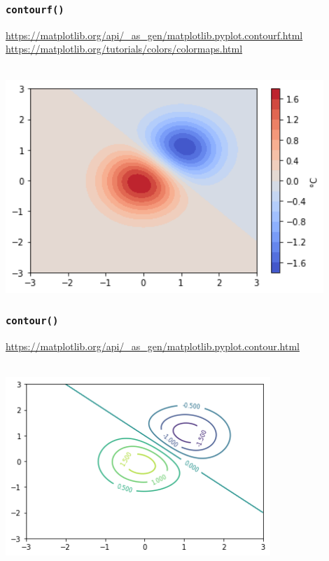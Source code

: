 	\subsubsection{\texttt{contourf()}}
\url{https://matplotlib.org/api/_as_gen/matplotlib.pyplot.contourf.html}\\
\url{https://matplotlib.org/tutorials/colors/colormaps.html}\\
\begin{minipage}[t]{0.54\textwidth}
	
\end{minipage}
\hspace{0.02\textwidth}
\begin{minipage}[t]{0.44\textwidth}
	$\quad$\\[1pt]
	\includegraphics[width=0.9\textwidth]{images/v9_matplotlib2}
\end{minipage}




\subsubsection{\texttt{contour()}}
\url{https://matplotlib.org/api/_as_gen/matplotlib.pyplot.contour.html}\\
\begin{minipage}[t]{0.49\textwidth}
	
\end{minipage}
\hspace{0.02\textwidth}
\begin{minipage}[t]{0.49\textwidth}
	$\quad$\\[1pt]
	\includegraphics[width=0.75\textwidth]{images/v9_matplotlib3}
\end{minipage}


